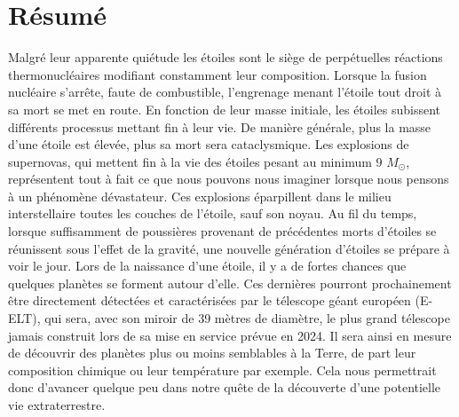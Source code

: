 
\chapter*{Résumé}
\thispagestyle{empty}

\vfill


Malgré leur apparente quiétude les étoiles sont le siège de perpétuelles réactions thermonucléaires modifiant constamment leur composition. Lorsque la fusion nucléaire s'arrête, faute de combustible, l'engrenage menant l'étoile tout droit à sa mort se met en route. En fonction de leur masse initiale, les étoiles subissent différents processus mettant fin à leur vie. De manière générale, plus la masse d'une étoile est élevée, plus sa mort sera cataclysmique. Les explosions de supernovas, qui mettent fin à la vie des étoiles pesant au minimum 9  $M_\odot$, représentent tout à fait ce que nous pouvons nous imaginer lorsque nous pensons à un phénomène dévastateur. Ces explosions éparpillent dans le milieu interstellaire toutes les couches de l'étoile, sauf son noyau. Au fil du temps, lorsque suffisamment de poussières provenant de précédentes morts d'étoiles se réunissent sous l'effet de la gravité, une nouvelle génération d'étoiles se prépare à voir le jour. Lors de la naissance d'une étoile, il y a de fortes chances que quelques planètes se forment autour d'elle. Ces dernières pourront prochainement être directement détectées et caractérisées par le télescope géant européen (E-ELT), qui sera, avec son miroir de 39  mètres de diamètre, le plus grand télescope jamais construit lors de sa mise en service prévue en 2024. Il sera ainsi en mesure de découvrir des planètes plus ou moins semblables à la Terre, de part leur composition chimique ou leur température par exemple. Cela nous permettrait donc d'avancer quelque peu dans notre quête de la découverte d'une potentielle vie extraterrestre.



\vfill



